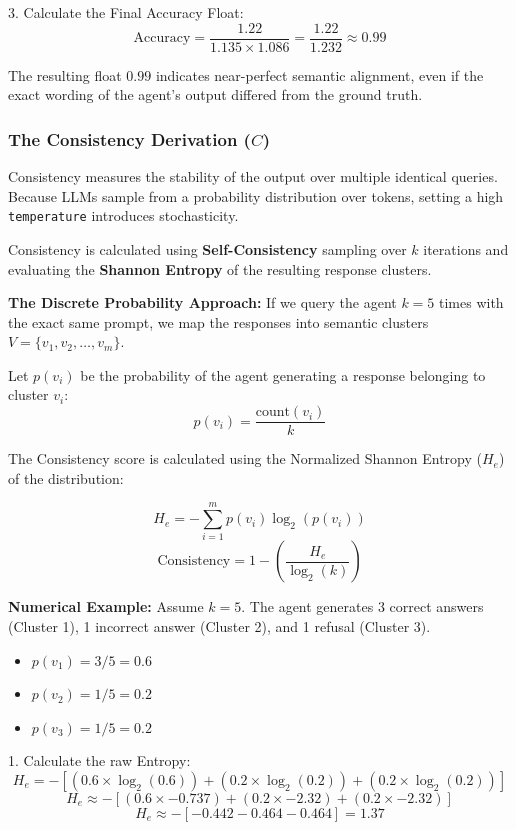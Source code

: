 \documentclass[11pt,a4paper]{article}
\begin{document}
3. Calculate the Final Accuracy Float:
\[ \text{Accuracy} = \frac{1.22}{1.135 \times 1.086} = \frac{1.22}{1.232} \approx 0.99 \]

The resulting float $0.99$ indicates near-perfect semantic alignment, even if the exact wording of the agent's output differed from the ground truth.

\newpage

\subsubsection{The Consistency Derivation ($C$)}

Consistency measures the stability of the output over multiple identical queries. Because LLMs sample from a probability distribution over tokens, setting a high \texttt{temperature} introduces stochasticity.

Consistency is calculated using \textbf{Self-Consistency} sampling over $k$ iterations and evaluating the \textbf{Shannon Entropy} of the resulting response clusters.

\textbf{The Discrete Probability Approach:}
If we query the agent $k=5$ times with the exact same prompt, we map the responses into semantic clusters $V = \{v_1, v_2, \dots, v_m\}$. 

Let $p(v_i)$ be the probability of the agent generating a response belonging to cluster $v_i$:
\[ p(v_i) = \frac{\text{count}(v_i)}{k} \]

The Consistency score is calculated using the Normalized Shannon Entropy ($H_e$) of the distribution:

\begin{tcolorbox}[colback=white, colframe=dpiblue, title=\textbf{Normalized Shannon Entropy Equation}]
\[ H_e = - \sum_{i=1}^{m} p(v_i) \log_2(p(v_i)) \]
\[ \text{Consistency} = 1 - \left( \frac{H_e}{\log_2(k)} \right) \]
\end{tcolorbox}

\textbf{Numerical Example:}
Assume $k=5$. The agent generates 3 correct answers (Cluster 1), 1 incorrect answer (Cluster 2), and 1 refusal (Cluster 3).
\begin{itemize}
    \item $p(v_1) = 3/5 = 0.6$
    \item $p(v_2) = 1/5 = 0.2$
    \item $p(v_3) = 1/5 = 0.2$
\end{itemize}

1. Calculate the raw Entropy:
\[ H_e = - [ (0.6 \times \log_2(0.6)) + (0.2 \times \log_2(0.2)) + (0.2 \times \log_2(0.2)) ] \]
\[ H_e \approx - [ (0.6 \times -0.737) + (0.2 \times -2.32) + (0.2 \times -2.32) ] \]
\[ H_e \approx - [ -0.442 - 0.464 - 0.464 ] = 1.37 \]
\end{document}
